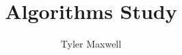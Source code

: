 


\usepackage{amsfonts, amssymb, amsmath}
\usepackage[margin=1.5cm]{geometry}
\usepackage[colorlinks=true, urlcolor=blue, linkcolor=red]{hyperref}

\title{Algorithms Study}
\author{Tyler Maxwell}
